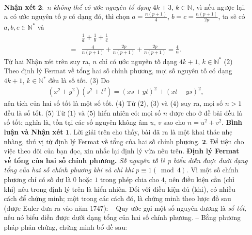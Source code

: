 \begin{multicols}{2}
\begin{align*}
	\end{align*}
	\textbf{\color{thachthuctoanhoc}Nhận xét} $\pmb{2:}$ $n$ \textit{không thể có ước nguyên tố dạng} $4k + 3$, $k \in \mathbb{N}$, vì nếu ngược lại, $n$ có ước nguyên tố $p$ có dạng đó, thì chọn  $a = \frac{{n\left( {p + 1} \right)}}{4}$,  $b = c = \frac{{n\left( {p + 1} \right)}}{{2p}}$, ta sẽ có $a,b,c \in \mathbb{N^*}$  và
	\begin{align*}
		&\frac{1}{a} + \frac{1}{b} + \frac{1}{c} \\
		= &\frac{4}{{n\left( {p + 1} \right)}} + \frac{{2p}}{{n\left( {p + 1} \right)}} + \frac{{2p}}{{n\left( {p + 1} \right)}} = \frac{4}{n}.
	\end{align*}
	Từ hai Nhận xét trên suy ra, $n$ chỉ có ước nguyên tố dạng $4k + 1$, $k \in \mathbb{N^*}$  \hfill        ($2$)
	\vskip 0.05cm
	Theo định lý Fermat về tổng hai số chính phương, mọi số nguyên tố có dạng $4k + 1$, $k \in \mathbb{N^*}$  đều là số tốt. \hfill ($3$)
	\vskip 0.05cm
	Do
	\begin{align*}
		\left( {{x^2} + {y^2}} \right)\!\!\left( {{s^2} + {t^2}} \right) \!=\! {\left( {xs + yt} \right)^2} \!+\! {\left( {xt - ys} \right)^2},
	\end{align*}
	nên tích của hai số tốt là một số tốt. \hfill ($4$)
	\vskip 0.05cm
	Từ ($2$), ($3$) và ($4$) suy ra, mọi số $n > 1$ đều là số tốt. ($5$)
	\vskip 0.05cm
	Từ ($1$) và ($5$) hiển nhiên có: mọi số $n$ được cho ở đề bài đều là số tốt; nghĩa là, tồn tại các số nguyên không âm $u$, $v$ sao cho $n = u^2 + v^2$.
	\vskip 0.05cm 
	\textbf{\color{thachthuctoanhoc}Bình luận và Nhận xét}
	\vskip 0.05cm
	$\pmb{1.}$ Lời giải trên cho thấy, bài đã ra là một khai thác nhẹ nhàng, thú vị từ định lý Fermat về tổng của hai số chính phương.
	\vskip 0.05cm
	$\pmb{2.}$ Để tiện cho việc theo dõi của bạn đọc, xin nhắc lại định lý vừa nêu trên.
	\vskip 0.05cm
	\textbf{\color{thachthuctoanhoc}Định lý Fermat về tổng của hai số chính phương.} \textit{Số nguyên tố lẻ p biểu diễn được dưới dạng tổng của hai số chính phương khi và chỉ khi $p \equiv 1\left( {\bmod 4} \right)$.}
	\vskip 0.05cm 
	Vì một số chính phương chỉ có số dư là $0$ hoặc $1$ trong phép chia cho $4$, nên điều kiện cần (chỉ khi) nêu trong định lý trên là hiển nhiên.
	\vskip 0.05cm
	Đối với điều kiện đủ (khi), có nhiều cách để chứng minh; một trong các cách đó, là chứng minh theo lược đồ sau (được Euler đưa ra vào năm $1747$):
	\vskip 0.05cm
	-- Quy ước gọi một số nguyên dương là \textit{số tốt}, nếu nó biểu diễn được dưới dạng tổng của hai số chính phương.
	\vskip 0.05cm
	-- Bằng phương pháp phản chứng, chứng minh bổ đề sau:

\end{multicols}
